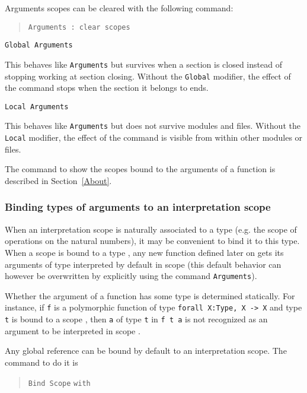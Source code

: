 Arguments scopes can be cleared with the following command:

\begin{quote}
{\tt Arguments {\qualid} : clear scopes}
\end{quote}

\begin{Variants}
\item {\tt Global Arguments} {\qualid} \nelist{\name {\tt \%}\scope}{}

This behaves like {\tt Arguments} {\qualid} \nelist{\name {\tt \%}\scope}{}
but survives when a section is closed instead
of stopping working at section closing. Without the {\tt Global} modifier,
the effect of the command stops when the section it belongs to ends.

\item {\tt Local Arguments} {\qualid} \nelist{\name {\tt \%}\scope}{}

This behaves like {\tt Arguments} {\qualid} \nelist{\name {\tt \%}\scope}{}
but does not survive modules and files.
Without the {\tt Local} modifier, the effect of the command is
visible from within other modules or files.

\end{Variants}

\SeeAlso The command to show the scopes bound to the arguments of a
function is described in Section~\ref{About}.

\subsubsection{Binding types of arguments to an interpretation scope}

When an interpretation scope is naturally associated to a type
(e.g. the scope of operations on the natural numbers), it may be
convenient to bind it to this type. When a scope {\scope} is bound to
a type {\type}, any new function defined later on gets its arguments
of type {\type} interpreted by default in scope {\scope} (this default
behavior can however be overwritten by explicitly using the command
{\tt Arguments}).

Whether the argument of a function has some type {\type} is determined
statically. For instance, if {\tt f} is a polymorphic function of type
{\tt forall X:Type, X -> X} and type {\tt t} is bound to a scope
{\scope}, then {\tt a} of type {\tt t} in {\tt f~t~a} is not
recognized as an argument to be interpreted in scope {\scope}.

Any global reference can be bound by default to an
interpretation scope. The command to do it is
\begin{quote}
{\tt Bind Scope} {\scope} \texttt{with} {\qualid}
\end{quote}

